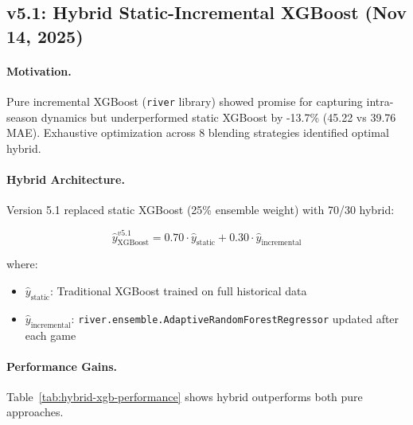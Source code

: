 \subsection{v5.1: Hybrid Static-Incremental XGBoost (Nov 14, 2025)}

\paragraph{Motivation.}
Pure incremental XGBoost (\texttt{river} library) showed promise for capturing intra-season dynamics but underperformed static XGBoost by -13.7\% (45.22 vs 39.76 MAE). Exhaustive optimization across 8 blending strategies identified optimal hybrid.

\paragraph{Hybrid Architecture.}
Version 5.1 replaced static XGBoost (25\% ensemble weight) with 70/30 hybrid:

\begin{equation}
\label{eq:hybrid-xgb}
\hat{y}_{\text{XGBoost}}^{v5.1} = 0.70 \cdot \hat{y}_{\text{static}} + 0.30 \cdot \hat{y}_{\text{incremental}}
\end{equation}

\noindent where:
\begin{itemize}[itemsep=2pt,parsep=0pt]
    \item $\hat{y}_{\text{static}}$: Traditional XGBoost trained on full historical data
    \item $\hat{y}_{\text{incremental}}$: \texttt{river.ensemble.AdaptiveRandomForestRegressor} updated after each game
\end{itemize}

\paragraph{Performance Gains.}
Table~\ref{tab:hybrid-xgb-performance} shows hybrid outperforms both pure approaches.

